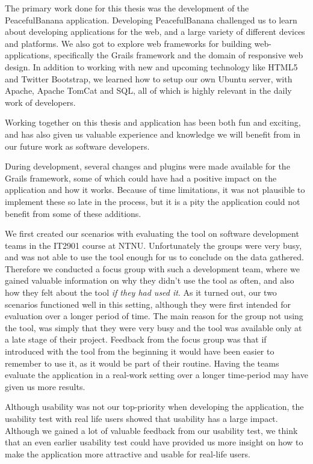 The primary work done for this thesis was the development of the PeacefulBanana application. Developing PeacefulBanana challenged us to learn about developing applications for the web, and a large variety of different devices and platforms. We also got to explore web frameworks for building web-applications, specifically the Grails framework and the domain of responsive web design. In addition to working with new and upcoming technology like HTML5 and Twitter Bootstrap, we learned how to setup our own Ubuntu server, with Apache, Apache TomCat and SQL, all of which is highly relevant in the daily work of developers.

Working together on this thesis and application has been both fun and exciting, and has also given us valuable experience and knowledge we will benefit from in our future work as software developers.

During development, several changes and plugins were made available for the Grails framework, some of which could have had a positive impact on the application and how it works. Because of time limitations, it was not plausible to implement these so late in the process, but it is a pity the application could not benefit from some of these additions. 

We first created our scenarios with evaluating the tool on software development teams in the IT2901 course at NTNU. Unfortunately the groups were very busy, and was not able to use the tool enough for us to conclude on the data gathered. Therefore we conducted a focus group with such a development team, where we gained valuable information on why they didn't use the tool as often, and also how they felt about the tool \emph{if they had used it}. As it turned out, our two scenarios functioned well in this setting, although they were first intended for evaluation over a longer period of time. The main reason for the group not using the tool, was simply that they were very busy and the tool was available only at a late stage of their project. Feedback from the focus group was that if introduced with the tool from the beginning it would have been easier to remember to use it, as it would be part of their routine. Having the teams evaluate the application in a real-work setting over a longer time-period may have given us more results. 

Although usability was not our top-priority when developing the application, the usability test with real life users showed that usability has a large impact. Although we gained a lot of valuable feedback from our usability test, we think that an even earlier usability test could have provided us more insight on how to make the application more attractive and usable for real-life users. 


